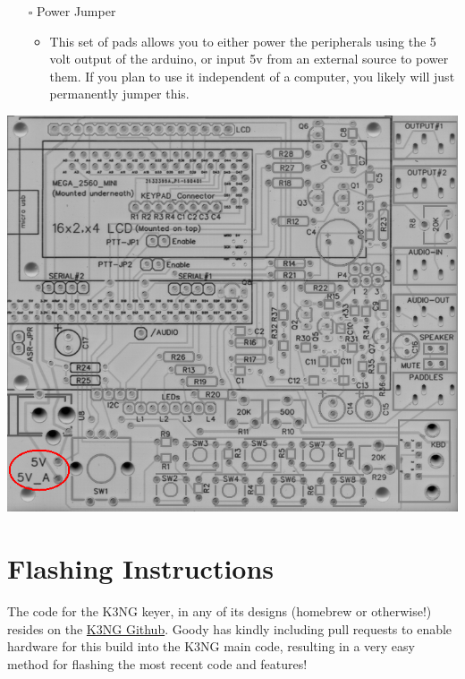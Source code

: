 \documentclass[11pt]{article}
\begin{document}
\newpage
\begin{itemize}
\item[{$\square$}] Power Jumper

\begin{itemize}
\item This set of pads allows you to either power the peripherals using the 5 volt output of the arduino, or input 5v from an external source to power them.  If you plan to use it independent of a computer, you likely will just permanently jumper this.
\end{itemize}
\end{itemize}
\begin{center}
\includegraphics[width=.9\linewidth]{../png/3.5/pcb-top-power-jumper.png}
\end{center}

\newpage
\section{Flashing Instructions}
\label{sec:orgd927fdd}
The code for the K3NG keyer, in any of its designs (homebrew or otherwise!) resides on the \href{https://github.com/k3ng/k3ng\_cw\_keyer}{K3NG Github}.  Goody has kindly including pull requests to enable hardware for this build into the K3NG main code, resulting in a very easy method for flashing the most recent code and features!
\end{document}
